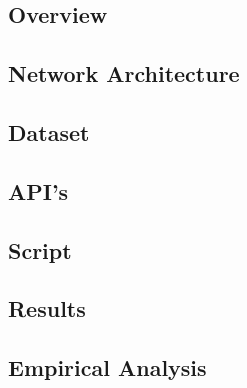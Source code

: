 \tocless\subsection{Overview}
\tocless\subsection{Network Architecture}
\tocless\subsection{Dataset}
\tocless\subsection{API's}
\tocless\subsection{Script}
\tocless\subsection{Results}
\tocless\subsection{Empirical Analysis}
